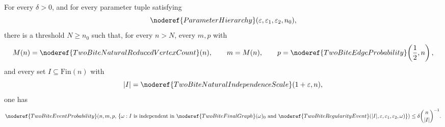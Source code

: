 \begin{lemma}
For every \(\delta>0\), and for every parameter tuple satisfying
\[
\noderef{ParameterHierarchy}(\varepsilon,\varepsilon_1,\varepsilon_2,n_0),
\]
there is a threshold \(N\ge n_0\) such that, for every \(n>N\), every
\(m,p\) with
\[
M(n)=\noderef{TwoBiteNaturalReducedVertexCount}(n),\qquad
m=M(n),\qquad
p=\noderef{TwoBiteEdgeProbability}\!\left(\frac12,n\right),
\]
and every set \(I\subseteq\mathrm{Fin}(n)\) with
\[
|I|=\noderef{TwoBiteNaturalIndependenceScale}(1+\varepsilon,n),
\]
one has
\[
\noderef{TwoBiteEventProbability}\!\left(n,m,p,\,
\{\omega:
I\text{ is independent in }\noderef{TwoBiteFinalGraph}(\omega)_0
\text{ and }
\noderef{TwoBiteRegularityEvent}
(|I|,\varepsilon,\varepsilon_1,\varepsilon_2,\omega)\}\right)
\le
\delta\binom n{|I|}^{-1}.
\]
\end{lemma}
